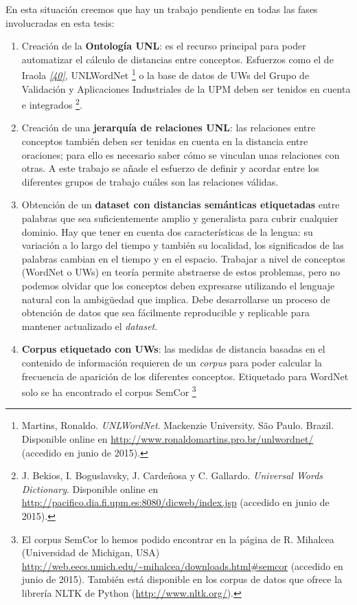 \documentclass[a4paper,12pt,spanish]{book}
\begin{document}
En esta situación creemos que hay un trabajo pendiente en todas las fases
involucradas en esta tesis:
\begin{enumerate}
\item {} 
Creación de la \textbf{Ontología UNL}: es el recurso principal para poder automatizar el
cálculo de distancias entre conceptos. Esfuerzos como el de Iraola \label{2.problem/index:id10}{\hyperref[zreferences:iraola2003]{\emph{{[}40{]}}}},
UNLWordNet \footnote{
Martins, Ronaldo. \emph{UNLWordNet}. Mackenzie University. São Paulo. Brazil. Disponible
online en \href{http://www.ronaldomartins.pro.br/unlwordnet/}{http://www.ronaldomartins.pro.br/unlwordnet/} (accedido en junio de 2015).
} o la base de datos de UWs del Grupo de Validación y Aplicaciones
Industriales de la UPM deben ser tenidos en cuenta e integrados \footnote{
J. Bekios, I. Boguslavsky, J. Cardeñosa y C. Gallardo. \emph{Universal Words Dictionary}.
Disponible online en \href{http://pacifico.dia.fi.upm.es:8080/dicweb/index.jsp}{http://pacifico.dia.fi.upm.es:8080/dicweb/index.jsp} (accedido en
junio de 2015).
}.

\item {} 
Creación de una \textbf{jerarquía de relaciones UNL}: las relaciones entre conceptos también
deben ser tenidas en cuenta en la distancia entre oraciones; para ello es necesario
saber cómo se vinculan unas relaciones con otras. A este trabajo se añade el esfuerzo
de definir y acordar entre los diferentes grupos de trabajo cuáles son las
relaciones válidas.

\item {} 
Obtención de un \textbf{dataset con distancias semánticas etiquetadas} entre palabras que
sea suficientemente amplio y generalista para cubrir cualquier dominio. Hay que
tener en cuenta dos características de la lengua: su variación a lo largo del tiempo
y también su localidad, los significados de las palabras cambian en el tiempo y en
el espacio. Trabajar a nivel de conceptos (WordNet o UWs) en teoría permite
abstraerse de estos problemas, pero no podemos olvidar que los conceptos deben
expresarse utilizando el lenguaje natural con la ambigüedad que implica. Debe
desarrollarse un proceso de obtención de datos que sea fácilmente reproducible y
replicable para mantener actualizado el \emph{dataset}.

\item {} 
\textbf{Corpus etiquetado con UWs}: las medidas de distancia basadas en el contenido
de información requieren de un \emph{corpus} para poder calcular la frecuencia de aparición
de los diferentes conceptos. Etiquetado para WordNet solo se ha encontrado el
corpus SemCor \footnote{
El corpus SemCor lo hemos podido encontrar en la página de R. Mihalcea (Universidad
de Michigan, USA) \href{http://web.eecs.umich.edu/~mihalcea/downloads.html\#semcor}{http://web.eecs.umich.edu/\textasciitilde{}mihalcea/downloads.html\#semcor} (accedido
en junio de 2015). También está disponible en los corpus de datos que ofrece la
librería NLTK de Python (\href{http://www.nltk.org/}{http://www.nltk.org/}).

}
\end{enumerate}
\end{document}
